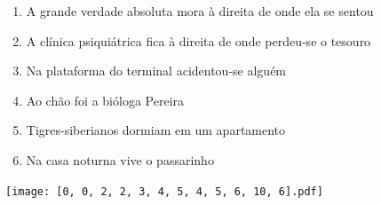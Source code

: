 \documentclass[12pt]{article}
\begin{document}
		 

\pagebreak


	\begin{enumerate}
		  \sffamily %
		  \large %


\vfill \item
A grande verdade absoluta mora	%
à direita
de onde ela se sentou	%

\vfill \item
A clínica psiquiátrica fica	%
à direita
de onde perdeu-se o tesouro	%

\vfill \item
Na plataforma do terminal	%
acidentou-se alguém	%

\vfill \item
Ao chão foi	%
a bióloga Pereira	%

\vfill \item
Tigres-siberianos dormiam	%
em um apartamento	%

\vfill \item
Na casa noturna	%
vive o passarinho	%
	\end{enumerate}
		  
		  \hfill

		  \vfill

\texttt{[image: [0, 0, 2, 2, 3, 4, 5, 4, 5, 6, 10, 6].pdf]}


	\hfill	  	  


\pagebreak			
\end{document}
